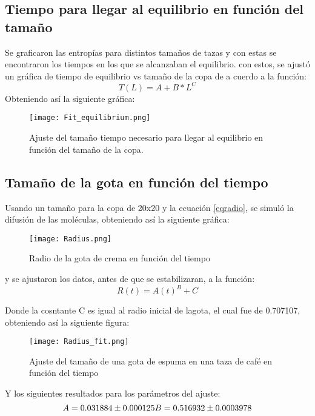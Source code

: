 \documentclass{article}
\begin{document}
\subsection{Tiempo para llegar al equilibrio en función del tamaño}
Se graficaron las entropías para distintos tamaños de tazas y con estas se encontraron los tiempos en los que se alcanzaban el equilibrio. con estos, se ajustó un gráfica de tiempo de equilibrio vs tamaño de la copa de a cuerdo a la función:
\begin{equation}
    T(L)=A+B*L^{C}
\end{equation}
Obteniendo así la siguiente gráfica:
\begin{figure}[H]
   \centering
   \texttt{[image: Fit\_equilibrium.png]}
   \caption{Ajuste del tamaño tiempo necesario para llegar al equilibrio en función del tamaño de la copa.}
   \label{fig:eqtime}
 \end{figure}
 



\subsection{Tamaño de la gota en función del tiempo}
Usando un tamaño para la copa de 20x20 y la ecuación \ref{eqradio}, se simuló la difusión de las moléculas, obteniendo así la siguiente gráfica:
\begin{figure}[H]
   \centering
   \texttt{[image: Radius.png]}
   \caption{Radio de la gota de crema en función del tiempo}
   \label{fig:radius}
 \end{figure}

y se ajustaron los datos, antes de que se estabilizaran, a la función:
\begin{equation}
    R(t)=A(t)^{B}+C
\end{equation}

Donde la cosntante C es igual al radio inicial de lagota, el cual fue de 0.707107, obteniendo así la siguiente figura:
\begin{figure}[H]
   \centering
   \texttt{[image: Radius\_fit.png]}
   \caption{Ajuste del tamaño de una gota de espuma en una taza de café en función del tiempo}
   \label{fig:radius}
 \end{figure}
 Y los siguientes resultados para los parámetros del ajuste:
 \begin{equation}
     A=0.031884 \pm 0.000125 \\
     B= 0.516932 \pm 0.0003978
 \end{equation}
 
\end{document}
